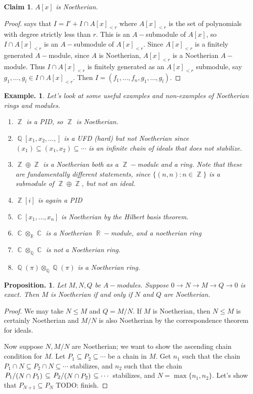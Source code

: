 \documentclass[11pt, a4paper]{memoir}
\DeclareMathOperator{\Q}{{\mathbb{Q}}}
\DeclareMathOperator{\Z}{{\mathbb{Z}}}
\DeclareMathOperator{\R}{{\mathbb{R}}}
\DeclareMathOperator{\C}{{\mathbb{C}}}
\theoremstyle{change}
\newtheorem{proposition}[theorem]{Proposition.}
\theoremstyle{plain}
\newtheorem{claim}{Claim}
\theoremstyle{nonumberplain}
\newtheorem{example}{Example.}
\newtheorem{proof}{Proof}
\newcommand{\quot}[2]{\mathchoice{\left.\raisebox{0.10em}{$#1$}\middle/\raisebox{-0.10em}{$#2$}\right.}
                                 {\left.\raisebox{0.04em}{$#1$}\middle/\raisebox{-0.04em}{$#2$}\right.}
                                 {\left.\raisebox{0.01em}{$#1$}\middle/\raisebox{-0.01em}{$#2$}\right.}
                                 {\left.\raisebox{0em}{$#1$}\middle/\raisebox{0em}{$#2$}\right.}}
\numberwithin{equation}{section}
\begin{document}
\begin{claim}
    $A[x]$ is Noetherian.
\end{claim}
\begin{proof}
     says that $I=I'+I\cap A[x]_{<r}$ where $A[x]_{<r}$ is the set of polynomials with degree strictly less than $r$.
    This is an $A-$submodule of $A[x]$, so $I\cap A[x]_{<r}$ is an $A-$submodule of $A[x]_{<r}$.
    Since $A[x]_{<r}$ is a finitely generated $A-$module, since $A$ is Noetherian, $A[x]_{<r}$ is a Noetherian $A-$module.
    Thus $I\cap A[x]_{<r}$ is finitely generated as an $A[x]_{<r}$ submodule, say $g_1,\ldots,g_l\in I\cap A[x]_{<r}$.
    Then $I=(f_1,\ldots,f_n,g_1,\ldots,g_l)$.
\end{proof}
\begin{example}
    Let's look at some useful examples and non-examples of Noetherian rings and modules.
    \begin{enumerate}[nl]
        \item $\Z$ is a PID, so $\Z$ is Noetherian.
        \item $\Q[x_1,x_2,\ldots,]$ is a UFD (hard) but not Noetherian since $(x_1)\subseteq(x_1,x_2)\subseteq\cdots$ is an infinite chain of ideals that does not stabilize.
        \item $\Z\oplus\Z$ is a Noetherian both as a $\Z-$module and a ring.
            Note that these are fundamentally different statements, since $\{(n,n):n\in\Z\}$ is a submodule of $\Z\oplus\Z$, but not an ideal.
        \item $\Z[i]$ is again a PID
        \item $\C[x_1,\ldots,x_n]$ is Noetherian by the Hilbert basis theorem.
        \item $\C\otimes_{\R}\C$ is a Noetherian $\R-$module, and a noetherian ring
        \item $\C\otimes_{\Q}\C$ is not a Noetherian ring.
        \item $\Q(\pi)\otimes_{\Q}\Q(\pi)$ is a Noetherian ring.
    \end{enumerate}
\end{example}
\begin{proposition}
    Let $M,N,Q$ be $A-$modules.
    Suppose $0\to N\to M\to Q\to 0$ is exact.
    Then $M$ is Noetherian if and only if $N$ and $Q$ are Noetherian.
\end{proposition}
\begin{proof}
    We may take $N\leq M$ and $Q=M/N$.
    If $M$ is Noetherian, then $N\leq M$ is certainly Noetherian and $M/N$ is also Noetherian by the correspondence theorem for ideals.

    Now suppose $N,M/N$ are Noetherian; we want to show the ascending chain condition for $M$.
    Let $P_1\subseteq P_2\subseteq\cdots$ be a chain in $M$.
    Get $n_1$ such that the chain $P_1\cap N\subseteq P_2\cap N\subseteq\cdots$ stabilizes, and $n_2$ such that the chain $\quot{P_1}{(N\cap P_1)}\subseteq \quot{P_2}{(N\cap P_2)}\subseteq\cdots$ stabilizes, and $N=\max\{n_1,n_2\}$.
    Let's show that $P_{N+1}\subseteq P_N$ TODO: finish.
\end{proof}
\end{document}
